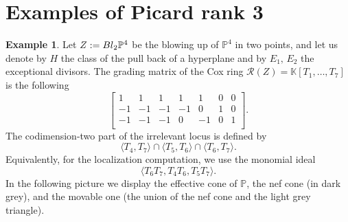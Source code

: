 \documentclass{amsart}
\theoremstyle{definition}
\newtheorem{example}[theorem]{Example}
\theoremstyle{remark}
\begin{document}
\section{Examples of Picard rank 3}
\label{sec:rank3}

\begin{example}
\label{ex-1}
 Let $Z := {\rm Bl}_2\mathbb P^4$ be the
 blowing up of $\mathbb P^4$ in two points,
 and let us denote by $H$ the class of the
 pull back of a hyperplane and by
 $E_1,\, E_2$ the exceptional divisors.
 The grading matrix
 of the Cox ring $\mathcal R(Z) =
 \mathbb K[T_1,\dots,T_7]$ is the following
\[
\left[
 \begin{array}{rrrrrrr}
  1 & 1 & 1 & 1 & 1 & 0 & 0\\
  -1 & -1 & -1 & -1 & 0 & 1 & 0\\
  -1 & -1 & -1 & 0 & -1 & 0 & 1\\
  \end{array}
  \right].
\]
The codimension-two part of the irrelevant locus is defined by
\[
\langle T_4,T_7\rangle\cap\langle T_5,T_6\rangle\cap\langle T_6,T_7\rangle.
\]
Equivalently, for the localization computation, we use the monomial ideal
\[
\langle T_6T_7, T_4T_6, T_5T_7 \rangle.
\]
In the following picture
we display the
effective cone of $\mathbb P$, the nef cone (in dark grey), and the movable one (the union of the
nef cone and the light grey triangle).

\begin{center}
\end{center}


\end{example}
\end{document}
